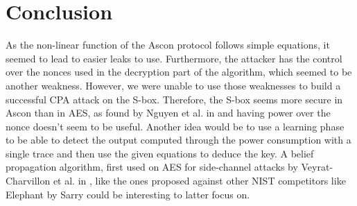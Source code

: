 \documentclass[a4paper,11pt,twocolumn]{article}
\begin{document}
	\section{Conclusion}
	As the non-linear function of the Ascon protocol follows simple equations, it seemed to lead to easier leaks to use. Furthermore, the attacker has the control over the nonces used in the decryption part of the algorithm, which seemed to be another weakness. However, we were unable to use those weaknesses to build a successful CPA attack on the S-box. Therefore, the S-box seems more secure in Ascon than in AES, as found by Nguyen et al. in \cite{cpa_analysis} and having power over the nonce doesn't seem to be useful. Another idea would be to use a learning phase to be able to detect the output computed through the power consumption with a single trace and then use the given equations \cite{these} to deduce the key. A belief propagation algorithm, first used on AES for side-channel attacks by Veyrat-Charvillon et al. in \cite{bp_aes}, like the ones proposed against other NIST competitors like Elephant by Sarry \cite{these} could be interesting to latter focus on.
	
	\appendix
	
	 
	
	
\end{document}
